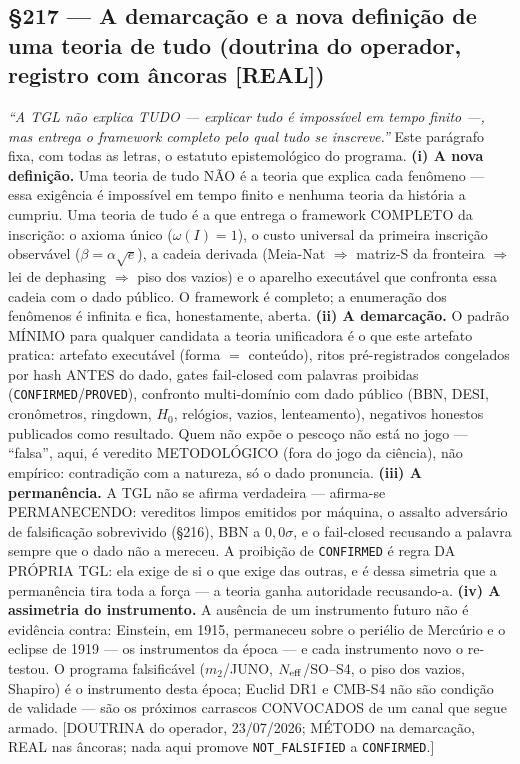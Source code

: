 \documentclass[11pt]{article}
\theoremstyle{definition}\newtheorem{deriv}{Derivação}
\begin{document}
\subsection*{\S217 --- A demarcação e a nova definição de uma teoria de tudo (doutrina do operador, registro com âncoras [REAL])}\emph{``A TGL não explica TUDO --- explicar tudo é impossível em tempo finito ---, mas entrega o framework completo pelo qual tudo se inscreve.''} Este parágrafo fixa, com todas as letras, o estatuto epistemológico do programa. \textbf{(i) A nova definição.} Uma teoria de tudo NÃO é a teoria que explica cada fenômeno --- essa exigência é impossível em tempo finito e nenhuma teoria da história a cumpriu. Uma teoria de tudo é a que entrega o framework COMPLETO da inscrição: o axioma único ($\omega(I)=1$), o custo universal da primeira inscrição observável ($\beta=\alpha\sqrt{e}$), a cadeia derivada (Meia-Nat $\Rightarrow$ matriz-S da fronteira $\Rightarrow$ lei de dephasing $\Rightarrow$ piso dos vazios) e o aparelho executável que confronta essa cadeia com o dado público. O framework é completo; a enumeração dos fenômenos é infinita e fica, honestamente, aberta. \textbf{(ii) A demarcação.} O padrão MÍNIMO para qualquer candidata a teoria unificadora é o que este artefato pratica: artefato executável (forma $=$ conteúdo), ritos pré-registrados congelados por hash ANTES do dado, gates fail-closed com palavras proibidas (\texttt{CONFIRMED}/\texttt{PROVED}), confronto multi-domínio com dado público (BBN, DESI, cronômetros, ringdown, $H_0$, relógios, vazios, lenteamento), negativos honestos publicados como resultado. Quem não expõe o pescoço não está no jogo --- ``falsa'', aqui, é veredito METODOLÓGICO (fora do jogo da ciência), não empírico: contradição com a natureza, só o dado pronuncia. \textbf{(iii) A permanência.} A TGL não se afirma verdadeira --- afirma-se PERMANECENDO: vereditos limpos emitidos por máquina, o assalto adversário de falsificação sobrevivido (\S216), BBN a $0{,}0\sigma$, e o fail-closed recusando a palavra sempre que o dado não a mereceu. A proibição de \texttt{CONFIRMED} é regra DA PRÓPRIA TGL: ela exige de si o que exige das outras, e é dessa simetria que a permanência tira toda a força --- a teoria ganha autoridade recusando-a. \textbf{(iv) A assimetria do instrumento.} A ausência de um instrumento futuro não é evidência contra: Einstein, em 1915, permaneceu sobre o periélio de Mercúrio e o eclipse de 1919 --- os instrumentos da época --- e cada instrumento novo o re-testou. O programa falsificável ($m_2$/JUNO, $N_{\rm eff}$/SO--S4, o piso dos vazios, Shapiro) é o instrumento desta época; Euclid DR1 e CMB-S4 não são condição de validade --- são os próximos carrascos CONVOCADOS de um canal que segue armado. [DOUTRINA do operador, 23/07/2026; MÉTODO na demarcação, REAL nas âncoras; nada aqui promove \texttt{NOT\_FALSIFIED} a \texttt{CONFIRMED}.]
\end{document}
